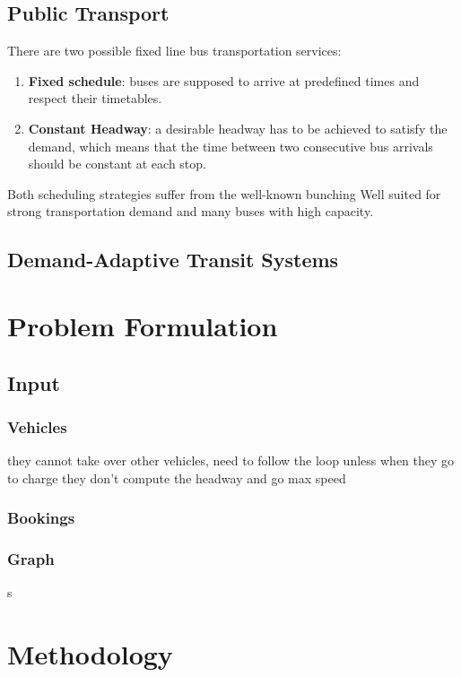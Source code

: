 \documentclass[12pt,a4paper]{article}
\begin{document}
\subsection{Public Transport}\label{pubtrans}
There are two possible fixed line bus transportation services: 
\begin{enumerate}
\item \textbf{Fixed schedule}: buses are supposed to arrive at predefined times and respect their timetables. 
\item \textbf{Constant Headway}: a desirable headway has to be achieved to satisfy the demand, which means that the time between two consecutive bus arrivals should be constant at each stop. 
\end{enumerate}
Both scheduling strategies suffer from the well-known bunching 
Well suited for strong transportation demand and many buses with high capacity. 

\subsection{Demand-Adaptive Transit Systems}\label{das}

\subsection{}\label{luts}

\section{Problem Formulation}
\subsection{Input}
\subsubsection{Vehicles}
they cannot take over other vehicles, need to follow the loop unless when they go to charge they don't compute the headway and go max speed
\subsubsection{Bookings}
\subsubsection{Graph}s
\section{Methodology}
\end{document}
